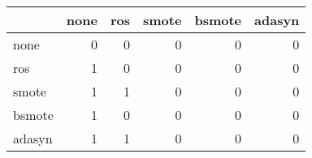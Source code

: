 \begin{tabular}{lrrrrr}
\hline
        &   none &   ros &   smote &   bsmote &   adasyn \\
\hline
 none   &      0 &     0 &       0 &        0 &        0 \\
 ros    &      1 &     0 &       0 &        0 &        0 \\
 smote  &      1 &     1 &       0 &        0 &        0 \\
 bsmote &      1 &     0 &       0 &        0 &        0 \\
 adasyn &      1 &     1 &       0 &        0 &        0 \\
\hline
\end{tabular}